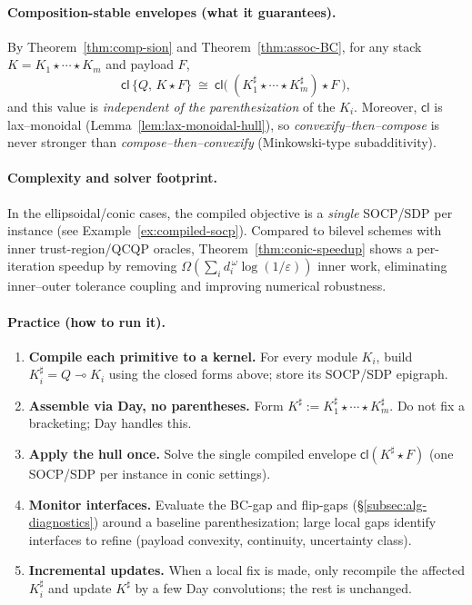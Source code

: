 \documentclass[11pt]{article}
\numberwithin{equation}{section}
\theoremstyle{upright}
\begin{document}
\paragraph{Composition-stable envelopes (what it guarantees).}
By Theorem~\ref{thm:comp-sion} and Theorem~\ref{thm:assoc-BC}, for any stack
$K=K_1\star\cdots\star K_m$ and payload $F$,
\[
\mathsf{cl}\,\{Q,\,K\star F\}
\ \cong\
\mathsf{cl}\Big(\ (K_1^\sharp\star\cdots\star K_m^\sharp)\star F\ \Big),
\]
and this value is \emph{independent of the parenthesization} of the $K_i$.
Moreover, $\mathsf{cl}$ is lax–monoidal (Lemma~\ref{lem:lax-monoidal-hull}), so
\emph{convexify–then–compose} is never stronger than \emph{compose–then–convexify}
(Minkowski-type subadditivity).

\paragraph{Complexity and solver footprint.}
In the ellipsoidal/conic cases, the compiled objective is a \emph{single} SOCP/SDP
per instance (see Example~\ref{ex:compiled-socp}). Compared to bilevel schemes with
inner trust-region/QCQP oracles, Theorem~\ref{thm:conic-speedup} shows a per-iteration
speedup by removing $\Omega(\sum_i d_i^{\,\omega}\log(1/\varepsilon))$ inner work,
eliminating inner–outer tolerance coupling and improving numerical robustness.

\paragraph{Practice (how to run it).}
\begin{enumerate}[leftmargin=*, itemsep=.35ex]
\item \textbf{Compile each primitive to a kernel.} For every module $K_i$, build
$K_i^\sharp=Q\multimap K_i$ using the closed forms above; store its SOCP/SDP epigraph.
\item \textbf{Assemble via Day, no parentheses.} Form
$K^\sharp:=K_1^\sharp\star\cdots\star K_m^\sharp$. Do not fix a bracketing; Day handles this.
\item \textbf{Apply the hull once.} Solve the single compiled envelope
$\mathsf{cl}(K^\sharp\star F)$ (one SOCP/SDP per instance in conic settings).
\item \textbf{Monitor interfaces.} Evaluate the BC-gap and flip-gaps
(\S\ref{subsec:alg-diagnostics}) around a baseline parenthesization; large local gaps
identify interfaces to refine (payload convexity, continuity, uncertainty class).
\item \textbf{Incremental updates.} When a local fix is made, only recompile the affected
$K_i^\sharp$ and update $K^\sharp$ by a few Day convolutions; the rest is unchanged.
\end{enumerate}
\end{document}
